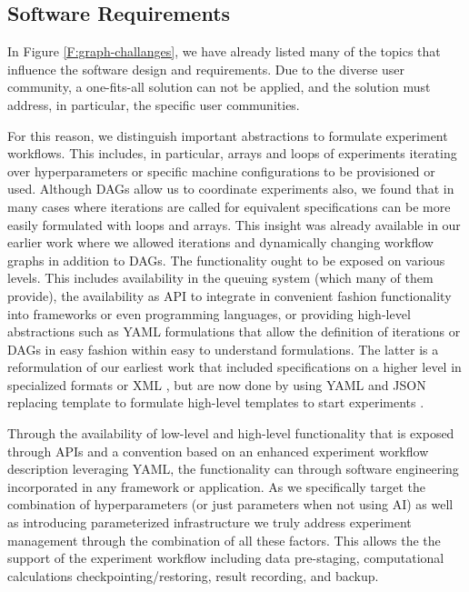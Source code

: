 \documentclass[utf8]{FrontiersinVancouver} %
\begin{document}
\subsection{Software Requirements}
\label{sec:sw-requirements}

In Figure \ref{F:graph-challanges}, we have already listed many of the topics that influence the software design and requirements. Due to the diverse user community, a one-fits-all solution can not be applied, and the solution must address, in particular, the specific user communities.

For this reason, we distinguish important abstractions to formulate experiment workflows. This includes, in particular, arrays and loops of experiments iterating over hyperparameters or specific machine configurations to be provisioned or used. 
Although DAGs allow us to coordinate experiments also, we found that in many cases where iterations are called for equivalent specifications can be more easily formulated with loops and arrays. This insight was already available in our earlier work where we allowed iterations and dynamically changing workflow graphs \citep{las07-workflow} in addition to DAGs. The functionality ought to be exposed on various levels. This includes availability in the queuing system (which many of them provide), the availability as API to integrate in convenient fashion functionality into frameworks or even programming languages, or providing high-level abstractions such as YAML formulations that allow the definition of iterations or DAGs in easy fashion within easy to understand formulations. The latter is a reformulation of our earliest work that included specifications on a higher level in specialized formats \citep{las-96-ecwmf}  or XML \citep{las07-workflow}, but are now done by using YAML and JSON replacing template to formulate high-level templates to start experiments \citep{cloudmesh-cc,cloudmesh-ee}.

Through the availability of low-level and high-level functionality that is exposed through APIs and a convention based on an enhanced experiment workflow description leveraging YAML, the functionality can through software engineering incorporated in any framework or application. 
As we specifically target the combination of hyperparameters (or just parameters when not using AI) as well as introducing parameterized infrastructure we truly address experiment management through the combination of all these factors.
This allows the the support of the experiment workflow including data pre-staging, computational calculations
checkpointing/restoring, result recording, and backup.
\end{document}

